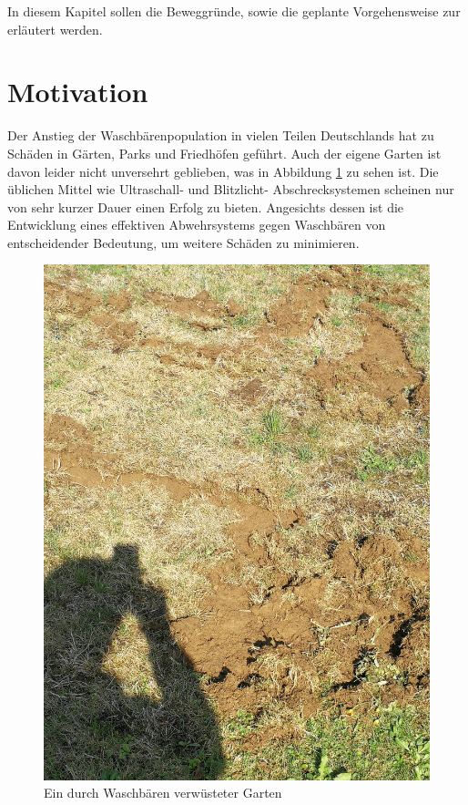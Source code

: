 
In diesem Kapitel sollen die Beweggründe, sowie die geplante Vorgehensweise zur \titel erläutert werden.


\section{Motivation}

Der Anstieg der Waschbärenpopulation in vielen Teilen Deutschlands hat zu Schäden in Gärten, Parks und Friedhöfen geführt. Auch der eigene Garten ist davon leider nicht unversehrt geblieben, was in Abbildung \ref{fig:Garten} zu sehen ist. Die üblichen Mittel wie Ultraschall- und Blitzlicht- Abschrecksystemen scheinen nur von sehr kurzer Dauer einen Erfolg zu bieten. Angesichts dessen ist die Entwicklung eines effektiven Abwehrsystems gegen Waschbären von entscheidender Bedeutung, um weitere Schäden zu minimieren.


\begin{figure}[h]
    \centering
    \includegraphics[angle=90,width=\textwidth]{images/Racoon_garden_ruin_0.jpeg}
    \caption[Verwüsteter Garten]{Ein durch Waschbären verwüsteter Garten}
    \label{fig:Garten}
\end{figure}


